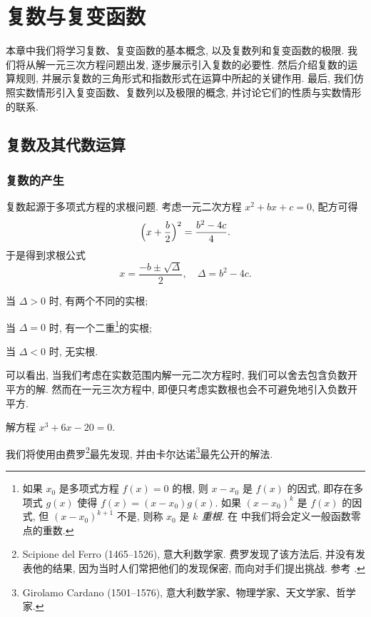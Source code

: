 
\chapter{复数与复变函数}
\label{chapter:1}

本章中我们将学习复数、复变函数的基本概念, 以及复数列和复变函数的极限.
我们将从解一元三次方程问题出发, 逐步展示引入复数的必要性. 然后介绍复数的运算规则, 并展示复数的三角形式和指数形式在运算中所起的关键作用. 最后, 我们仿照实数情形引入复变函数、复数列以及极限的概念, 并讨论它们的性质与实数情形的联系.

\section{复数及其代数运算}

\subsection{复数的产生}

复数起源于多项式方程的求根问题. 
考虑一元二次方程 $x^2+bx+c=0$, 配方可得
\[
  \Bigl(x+\frac b2\Bigr)^2=\frac{b^2-4c}4.
\]
于是得到求根公式
\[
  x=\frac{-b\pm\sqrt\Delta}2,\quad \Delta=b^2-4c.
\]
\begin{enumnopar}
  \item 当 $\Delta>0$ 时, 有两个不同的实根;
  \item 当 $\Delta=0$ 时, 有一个二重\footnote{%
    如果 $x_0$ 是多项式方程 $f(x)=0$ 的根, 则 $x-x_0$ 是 $f(x)$ 的因式, 即存在多项式 $g(x)$ 使得 $f(x)=(x-x_0)g(x)$.
    如果 $(x-x_0)^k$ 是 $f(x)$ 的因式, 但 $(x-x_0)^{k+1}$ 不是, 则称 $x_0$ 是 \emph{$k$ 重根}.
    在 中我们将会定义一般函数零点的重数.
  }的实根;
  \item 当 $\Delta<0$ 时, 无实根.
\end{enumnopar}


可以看出, 当我们考虑在实数范围内解一元二次方程时, 我们可以舍去包含\alert{负数开平方}的解.
然而在一元三次方程中, 即便只考虑实数根也会不可避免地引入负数开平方.

\begin{example}
  解方程 $x^3+6x-20=0$.
\end{example}

我们将使用由费罗\footnote{%
  Scipione del Ferro (1465--1526), 意大利数学家.
  费罗发现了该方法后, 并没有发表他的结果, 因为当时人们常把他们的发现保密, 而向对手们提出挑战. 参考 \cite[第13章4节]{Kline1990}.
}最先发现, 并由卡尔达诺\footnote{%
  Girolamo Cardano (1501--1576), 意大利数学家、物理学家、天文学家、哲学家.
}最先公开的解法.

